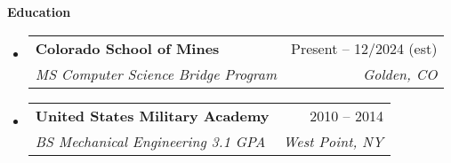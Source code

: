 \documentclass[letterpaper,12pt]{article}[leftmargin=*]
\makeatletter
\def \entryspacing {-0pt}
\renewcommand{\section}[2]{\vspace{5pt}
  \colorbox{secondary}{\color{white}\raggedbottom\normalsize\textbf{{#1}{\hspace{7pt}#2}}}
}
\newcommand{\resumeEntryStart}{\begin{itemize}[leftmargin=2.5mm]}
\newcommand{\resumeEntryEnd}{\end{itemize}\vspace{\entryspacing}}
\newcommand{\resumeEntryTSDL}[4]{
  \vspace{-1pt}\item[]
    \begin{tabularx}{0.97\textwidth}{X@{\hspace{60pt}}r}
      \textbf{\color{primary}#1} & {\firabook\color{accent}\small#2} \\
      \textit{\color{accent}\small#3} & \textit{\color{accent}\small#4} \\
    \end{tabularx}\vspace{-6pt}
}
\makeatother
\begin{document}
\section{\faGraduationCap}{Education}

  \resumeEntryStart
    \resumeEntryTSDL
    {Colorado School of Mines}{Present -- 12/2024 (est)}
    {MS Computer Science Bridge Program} {Golden, CO}
   \resumeEntryEnd
   
   \resumeEntryStart
    \resumeEntryTSDL
      {United States Military Academy}{2010 -- 2014}
      {BS Mechanical Engineering 3.1 GPA}{West Point, NY}
  \resumeEntryEnd
\end{document}
